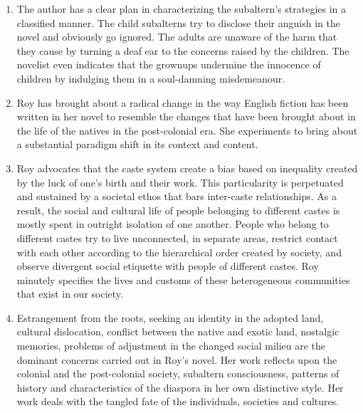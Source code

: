 \begin{enumerate}
  \item The author has a clear plan in characterizing the subaltern’s strategies in a classified manner. The child subalterns try to disclose their anguish in the novel and obviously go ignored. The adults are unaware of the harm that they cause by turning a deaf ear to the concerns raised by the children. The novelist even indicates that the grownups undermine the innocence of children by indulging them in a soul-damning misdemeanour.

  \item Roy has brought about a radical change in the way English fiction has been written in her novel to resemble the changes that have been brought about in the life of the natives in the post-colonial era. She experiments to bring about a substantial paradigm shift in its context and content.

  \item Roy advocates that the caste system create a bias based on inequality created by the luck of one’s birth and their work. This particularity is perpetuated and sustained by a societal ethos that bars inter-caste relationships. As a result, the social and cultural life of people belonging to different castes is mostly spent in outright isolation of one another.  People who belong to different castes try to live unconnected, in separate areas, restrict contact with each other according to the hierarchical order created by society, and observe divergent social etiquette with people of different castes. Roy minutely specifies the lives and customs of these heterogeneous communities that exist in our society.

  \item Estrangement from the roots, seeking an identity in the adopted land, cultural dislocation,  conflict between the native and exotic land, nostalgic memories, problems of adjustment in the changed social milieu are the dominant concerns carried out in Roy’s novel.  Her work reflects upon the colonial and the post-colonial society, subaltern consciousness, patterns of history and characteristics of the diaspora in her own distinctive style. Her work deals with the tangled fate of the individuals, societies and cultures.


\end{enumerate}
